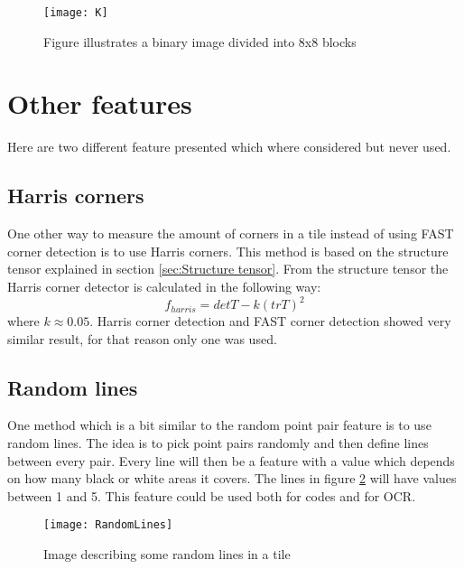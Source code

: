 \begin{figure}[H]
\centering
	\texttt{[image: K]}
	\caption{Figure illustrates a binary image divided into 8x8 blocks}
	\label{Pixelsums}
\end{figure}

\section{Other features}
\label{sec:Other features}
Here are two different feature presented which where considered but never used.
\subsection{Harris corners}
One other way to measure the amount of corners in a tile instead of using FAST corner detection is to use Harris corners. This method is based on the structure tensor explained in section \ref{sec:Structure tensor}. From the structure tensor the Harris corner detector is calculated in the following way:
\begin{equation}
	f_{harris} = det T - k(tr T)^2
\end{equation}
where $k \approx 0.05$. Harris corner detection and FAST corner detection showed very similar result, for that reason only one was used.

\subsection{Random lines}
One method which is a bit similar to the random point pair feature is to use random lines. The idea is to pick point pairs randomly and then define lines between every pair. Every line will then be a feature with a value which depends on how many black or white areas it covers. The lines in figure \ref{PointPairs} will have values between 1 and 5. This feature could be used both for codes and for OCR.  
\begin{figure}[H]
\centering
	\texttt{[image: RandomLines]}
	\caption{Image describing some random lines in a tile}
	\label{PointPairs}
\end{figure}

